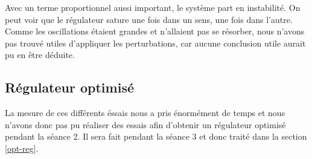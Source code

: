 Avec un terme proportionnel aussi important, le système part en instabilité.
On peut voir que le régulateur sature une fois dans un sens, une fois dans l'autre.
Comme les oscillations étaient grandes et n'allaient pas se résorber, nous
n'avons pas trouvé utiles d'appliquer les perturbations, car aucune conclusion
utile aurait pu en être déduite.



\subsection{Régulateur optimisé}
La mesure de ces différents éssais nous a pris énormément de temps et nous n'avons donc pas
pu réaliser des essais afin d'obtenir un régulateur optimisé pendant la séance 2. Il sera 
fait pendant la séance 3 et donc traité dans la section \ref{opt-reg}.

